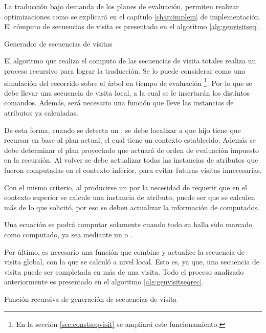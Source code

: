 La traducción bajo demanda de los planes de evaluación, permiten realizar optimizaciones como se explicará en el capítulo \ref{chap:implem} de implementación. El cómputo de secuencias de visita es presentado en el algoritmo \ref{alg:genvisitseq}.

\begin{algorithm}[!ht]

\caption{\label{alg:genvisitseq} Generador de secuencias de visitas}
\end{algorithm}

El algoritmo que realiza el computo de las secuencias de visita totales realiza un proceso recursivo para lograr la traducción. Se lo puede considerar como una simulación del recorrido sobre el árbol en tiempo de evaluación \footnote{En la sección \ref{sec:constseqvisit} se ampliará este funcionamiento.}. Por lo que se debe llevar una secuencia de visita local, a la cual se le insertarán los distintos comandos. Además, será necesario una función que lleve las instancias de atributos ya calculadas.

De esta forma, cuando se detecta un , se debe localizar a que hijo tiene que recursar en base al plan actual, el cual tiene un contexto establecido. Además se debe determinar el plan proyectado que actuará de orden de evaluación impuesto en la recursión. Al volver se debe actualizar todas las instancias de atributos que fueron computadas en el contexto inferior, para evitar futuras visitas innecesarias.

Con el mismo criterio, al producirse un  por la necesidad de requerir que en el contexto superior se calcule una instancia de atributo, puede ser que se calculen más de lo que solicitó, por eso se deben actualizar la información de computados.

Una ecuación se podrá computar solamente cuando todo su  halla sido marcado como computado, ya sea mediante un  o .

Por último, es necesario una función que combine y actualice la secuencia de visita global, con la que se calculó a nivel local. Esto es, ya que, una secuencia de visita puede ser completada en más de una visita. Todo el proceso analizado anteriormente es presentado en el algoritmo \ref{alg:genvisitseqrec}.

\begin{algorithm}[!ht]

\caption{\label{alg:genvisitseqrec} Función recursiva de generación de secuencias de visita}
\end{algorithm}

